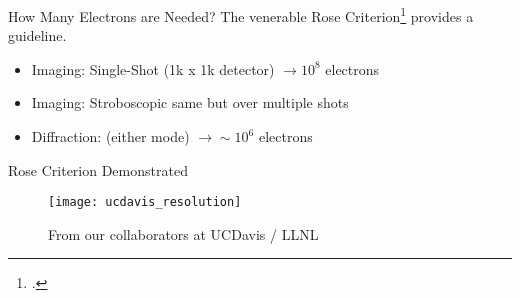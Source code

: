 \begin{frame}{How Many Electrons are Needed?}
  The venerable \alert<2->{Rose Criterion}\footcite{Rose_1948} provides a guideline.
  \vfill
  \vfill
  \begin{itemize}
    \item<3-> Imaging: Single-Shot (1k x 1k detector) $\rightarrow 10^8$ electrons
    \item<4-> Imaging: Stroboscopic same but over multiple shots
    \item<5-> Diffraction: (either mode) $\rightarrow \sim10^6$ electrons
  \end{itemize}
\end{frame}

\begin{frame}{Rose Criterion Demonstrated}
\begin{figure}
  \centering
  \texttt{[image: ucdavis\_resolution]}
  \caption{From our collaborators at UCDavis / LLNL}
\end{figure}
\end{frame}

